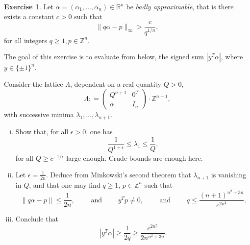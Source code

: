 \documentclass[12pt,a4paper]{article}
\theoremstyle{plain}
\newtheorem*{Sol*}{Solution}
\theoremstyle{definition}
\newtheorem{Ex}{Exercise}
\def \R {\mathbb R}
\def \Z {\mathbb Z}
\newcommand{\df}{\mathrel{\mathop:}=}
\newif\ifsolutions
\newcommand{\exercise}[2]{
			\begin{Ex} #1 \end{Ex}
			\ifsolutions  \begin{Sol*} #2 \end{Sol*} \bigskip \else \bigskip  \fi
		}
\begin{document}
\exercise{
	Let $\alpha = (\alpha_1, \dots, \alpha_n) \in \R^n$ be \emph{badly approximable}, that is there exists a constant $c > 0$ such that
		\[ \| q \alpha - p \|_\infty > \frac{c}{q^{1/n}}, \]
	for all integers $q \geq 1, p \in \Z^n$.

	The goal of this exercise is to evaluate from below, the signed sum $| y^T \alpha |$, where $y \in \{ \pm 1 \}^n$.

	Consider the lattice $\Lambda$, dependent on a real quantity $Q > 0$,
		\[ \Lambda \df \begin{pmatrix} Q^{n+1} & 0^T \\
								\alpha & I_n \end{pmatrix} \cdot \Z^{n+1}, \]
	with successive minima $\lambda_1, \dots, \lambda_{n+1}$.
	
	\begin{enumerate}[i)]
		\item 
		Show that, for all $\epsilon > 0$, one has
			\[ \frac{1}{Q^{1 + \epsilon}} \leq \lambda_1 \leq \frac{1}{Q}, \]
		for all $Q \geq c^{-1/\epsilon}$ large enough. Crude bounds are enough here.
		
		\item 
		Let $\epsilon = \frac1{2n}$. Deduce from Minkowski's second theorem that $\lambda_{n+1}$ is vanishing in $Q$, and that one may find $q \geq 1$, $p \in \Z^n$ such that
			\[ \| q \alpha - p \| \leq \frac{1}{2n}, \qquad \text{ and } \qquad y^T p \neq 0, \qquad \text{ and } \qquad q \leq \frac{(n+1)^{n^2 + 3n}}{c^{2n^2}}. \]
		
		\item
		Conclude that 
			\[ | y^T \alpha | \geq \frac{1}{2q} \geq \frac{c^{2n^2}}{2n^{n^2 + 3n}} . \]
	\end{enumerate}

}
{}
\end{document}
